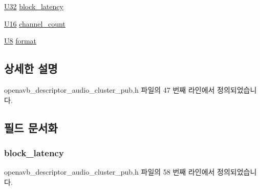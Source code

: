 \begin{DoxyCompactItemize}
\item 
\hyperlink{openavb__types__base__pub_8h_a696390429f2f3b644bde8d0322a24124}{U32} \hyperlink{structopenavb__aem__descriptor__audio__cluster__t_ac8dd29fd39cc138a898f39f7baa876ae}{block\+\_\+latency}
\item 
\hyperlink{openavb__types__base__pub_8h_a0a0a322d5fa4a546d293a77ba8b4a71f}{U16} \hyperlink{structopenavb__aem__descriptor__audio__cluster__t_a359a7395e4b3122969ec0ae646d366b5}{channel\+\_\+count}
\item 
\hyperlink{openavb__types__base__pub_8h_aa63ef7b996d5487ce35a5a66601f3e73}{U8} \hyperlink{structopenavb__aem__descriptor__audio__cluster__t_a37f3210787a8b11a8f8811f7cf167fdf}{format}
\end{DoxyCompactItemize}


\subsection{상세한 설명}


openavb\+\_\+descriptor\+\_\+audio\+\_\+cluster\+\_\+pub.\+h 파일의 47 번째 라인에서 정의되었습니다.



\subsection{필드 문서화}
\subsubsection[{\texorpdfstring{block\+\_\+latency}{block_latency}}]{ block\+\_\+latency}\hypertarget{structopenavb__aem__descriptor__audio__cluster__t_ac8dd29fd39cc138a898f39f7baa876ae}{}\label{structopenavb__aem__descriptor__audio__cluster__t_ac8dd29fd39cc138a898f39f7baa876ae}


openavb\+\_\+descriptor\+\_\+audio\+\_\+cluster\+\_\+pub.\+h 파일의 58 번째 라인에서 정의되었습니다.

